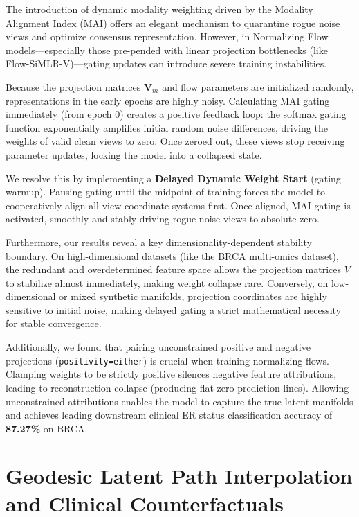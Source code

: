 \documentclass[
  letterpaper,
]{report}
\begin{document}
The introduction of dynamic modality weighting driven by the Modality
Alignment Index (MAI) offers an elegant mechanism to quarantine rogue
noise views and optimize consensus representation. However, in
Normalizing Flow models---especially those pre-pended with linear
projection bottlenecks (like Flow-SiMLR-V)---gating updates can
introduce severe training instabilities.

Because the projection matrices \(\mathbf{V}_m\) and flow parameters are
initialized randomly, representations in the early epochs are highly
noisy. Calculating MAI gating immediately (from epoch 0) creates a
positive feedback loop: the softmax gating function exponentially
amplifies initial random noise differences, driving the weights of valid
clean views to zero. Once zeroed out, these views stop receiving
parameter updates, locking the model into a collapsed state.

We resolve this by implementing a \textbf{Delayed Dynamic Weight Start}
(gating warmup). Pausing gating until the midpoint of training forces
the model to cooperatively align all view coordinate systems first. Once
aligned, MAI gating is activated, smoothly and stably driving rogue
noise views to absolute zero.

Furthermore, our results reveal a key dimensionality-dependent stability
boundary. On high-dimensional datasets (like the BRCA multi-omics
dataset), the redundant and overdetermined feature space allows the
projection matrices \(V\) to stabilize almost immediately, making weight
collapse rare. Conversely, on low-dimensional or mixed synthetic
manifolds, projection coordinates are highly sensitive to initial noise,
making delayed gating a strict mathematical necessity for stable
convergence.

Additionally, we found that pairing unconstrained positive and negative
projections
(\texttt{positivity=\textquotesingle{}either\textquotesingle{}}) is
crucial when training normalizing flows. Clamping weights to be strictly
positive silences negative feature attributions, leading to
reconstruction collapse (producing flat-zero prediction lines). Allowing
unconstrained attributions enables the model to capture the true latent
manifolds and achieves leading downstream clinical ER status
classification accuracy of \textbf{87.27\%} on BRCA.

\section{Geodesic Latent Path Interpolation and Clinical
Counterfactuals}\label{geodesic-latent-path-interpolation-and-clinical-counterfactuals}
\end{document}
